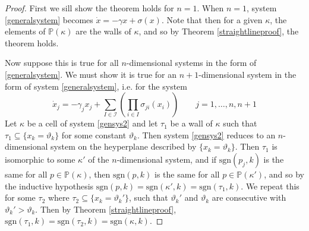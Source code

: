 \documentclass[12pt]{article}
\theoremstyle{definition}
\theoremstyle{remark}
\newcommand\sgn{\text{sgn}}
\newcommand{\bbP}{\mathbb{P}}
\begin{document}
\begin{proof}
First we sill show the theorem holds for $n=1$. When $n=1$, system \eqref{generalsystem} becomes $\dot{x}=-\gamma x + \sigma(x)$. Note that then for a given $\kappa$, the elements of $\bbP(\kappa)$ are the walls of $\kappa$, and so by Theorem \ref{straightlineproof}, the theorem holds.

Now suppose this is true for all $n$-dimensional systems in the form of \eqref{generalsystem}. We must show it is true for an $n+1$-dimensional system in the form of system \eqref{generalsystem}, i.e. for the system
\begin{equation} \label{gensys2}
\dot{x}_j=-\gamma_j x_j + \sum_{I\in \mathcal{I}}\left(\prod_{i\in I}\sigma_{ji}(x_i)\right)	\qquad	j=1,\dots,n,n+1
\end{equation}
Let $\kappa$ be a cell of system \eqref{gensys2} and let $\tau_1$ be a wall of $\kappa$ such that $\tau_1 \subseteq \{x_k=\vartheta_k\}$ for some constant $\vartheta_k$. Then system \eqref{gensys2} reduces to an $n$-dimensional system on the heyperplane described by $\{x_k=\vartheta_k\}$. Then $\tau_1$ is isomorphic to some $\kappa'$ of the $n$-dimensional system, and if $\sgn(p_j,k)$ is the same for all $p\in \bbP (\kappa)$, then $\sgn(p,k)$ is the same for all $p\in \bbP (\kappa')$, and so by the inductive hypothesis $\sgn(p,k)=\sgn(\kappa',k)=\sgn(\tau_1,k)$. We repeat this for some $\tau_2$ where $\tau_2 \subseteq \{x_k=\vartheta_k'\}$, such that $\vartheta_k'$ and $\vartheta_k$ are consecutive with $\vartheta_k' > \vartheta_k$. Then by Theorem \ref{straightlineproof}, $\sgn(\tau_1,k)=\sgn(\tau_2,k)=\sgn(\kappa,k)$.
\end{proof}
\end{document}
